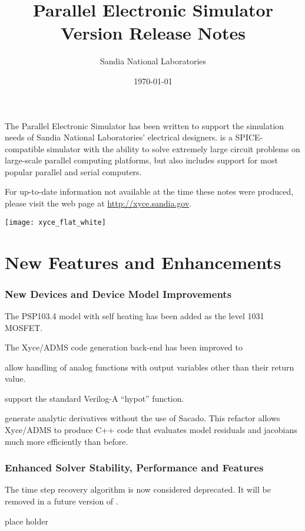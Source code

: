 \documentclass[letterpaper]{scrartcl}
\title{\XyceTitle{} Parallel Electronic Simulator\\
Version \XyceVersionVar{} Release Notes}
\author{ Sandia National Laboratories}
\date{\today}
\begin{document}
\maketitle

The \XyceTM{} Parallel Electronic Simulator has been written to support the
simulation needs of Sandia National Laboratories' electrical designers.
\XyceTM{} is a SPICE-compatible simulator with the ability to solve extremely
large circuit problems on large-scale parallel computing platforms, but also
includes support for most popular parallel and serial computers.

For up-to-date information not available at the time these notes were produced,
please visit the \XyceTM{} web page at
{\color{XyceDeepRed}\url{http://xyce.sandia.gov}}.


\tableofcontents
\vspace*{\fill}
\parbox{\textwidth}
{
  \hfill
  \texttt{[image: xyce\_flat\_white]}
}


\newpage
\section{New Features and Enhancements}

\subsubsection*{New Devices and Device Model Improvements}
\begin{XyceItemize}
\item The PSP103.4 model with self heating has been added as the level 1031 MOSFET.
\item The Xyce/ADMS code generation back-end has been improved to
  \begin{XyceItemize}
    \item allow handling of analog functions with output variables
      other than their return value.
    \item support the standard Verilog-A ``hypot'' function.
    \item generate analytic derivatives without the use of Sacado.
      This refactor allows Xyce/ADMS to produce C++ code that
      evaluates model residuals and jacobians much more efficiently
      than before.
  \end{XyceItemize}
\end{XyceItemize}

\subsubsection*{Enhanced Solver Stability, Performance and Features}
\begin{XyceItemize}
\item The time step recovery algorithm is now considered deprecated.  It will be removed in a future version of \Xyce{}.
\item place holder
\end{XyceItemize}
\end{document}
